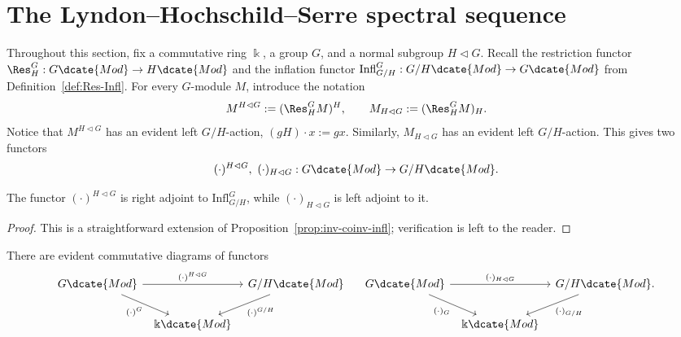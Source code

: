 
\section{The Lyndon--Hochschild--Serre spectral sequence}\label{sec:LHS-SS}
\hypertarget{o014.aljabr2.chapter6.lhs-spectral-sequence-a}{ }

Throughout this section, fix a commutative ring $\Bbbk$, a group $G$, and a
normal subgroup $H\lhd G$. Recall the restriction functor
$\Res^G_H:G\dcate{Mod}\to H\dcate{Mod}$ and the inflation functor
$\mathrm{Infl}^G_{G/H}:G/H\dcate{Mod}\to G\dcate{Mod}$ from
Definition~\ref{def:Res-Infl}. For every $G$-module $M$, introduce the
notation
\[ M^{H\lhd G}:=(\Res^G_HM)^H,\qquad
	M_{H\lhd G}:=(\Res^G_HM)_H. \]
Notice that $M^{H\lhd G}$ has an evident left $G/H$-action,
$(gH)\cdot x:=gx$. Similarly, $M_{H\lhd G}$ has an evident left
$G/H$-action. This gives two functors
\[ (\cdot)^{H\lhd G},\ (\cdot)_{H\lhd G}:
	G\dcate{Mod}\to G/H\dcate{Mod}. \]

\begin{lemma}
	The functor $(\cdot)^{H\lhd G}$ is right adjoint to
	$\mathrm{Infl}^G_{G/H}$, while $(\cdot)_{H\lhd G}$ is left adjoint to it.
\end{lemma}
\begin{proof}
	This is a straightforward extension of
	Proposition~\ref{prop:inv-coinv-infl}; verification is left to the reader.
\end{proof}

There are evident commutative diagrams of functors
\[\begin{tikzcd}[column sep=tiny]
	G\dcate{Mod} \arrow[rr,"{(\cdot)^{H\lhd G}}"]
	\arrow[rd,"{(\cdot)^G}"'] & &
	G/H\dcate{Mod} \arrow[ld,"{(\cdot)^{G/H}}"]\\
	& \Bbbk\dcate{Mod} &
\end{tikzcd}\quad\begin{tikzcd}[column sep=tiny]
	G\dcate{Mod} \arrow[rr,"{(\cdot)_{H\lhd G}}"]
	\arrow[rd,"{(\cdot)_G}"'] & &
	G/H\dcate{Mod}. \arrow[ld,"{(\cdot)_{G/H}}"]\\
	& \Bbbk\dcate{Mod} &
\end{tikzcd}\]

